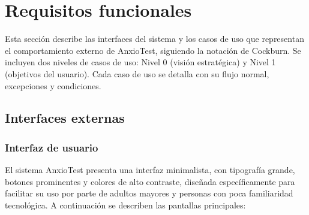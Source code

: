 \section{Requisitos funcionales}
\label{sec:requisitos_funcionales}

Esta sección describe las interfaces del sistema y los casos de uso que representan el comportamiento externo de AnxioTest, siguiendo la notación de Cockburn. Se incluyen dos niveles de casos de uso: Nivel 0 (visión estratégica) y Nivel 1 (objetivos del usuario). Cada caso de uso se detalla con su flujo normal, excepciones y condiciones.

\subsection{Interfaces externas}
\label{sec:interfaces_externas}

\subsubsection{Interfaz de usuario}
\label{sec:interfaz_usuario}

El sistema AnxioTest presenta una interfaz minimalista, con tipografía grande, botones prominentes y colores de alto contraste, diseñada específicamente para facilitar su uso por parte de adultos mayores y personas con poca familiaridad tecnológica. A continuación se describen las pantallas principales:

